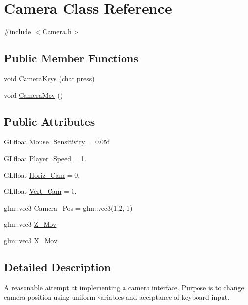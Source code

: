 \hypertarget{class_camera}{}\section{Camera Class Reference}
\label{class_camera}


{\ttfamily \#include $<$Camera.\+h$>$}

\subsection*{Public Member Functions}
\begin{DoxyCompactItemize}
\item 
void \hyperlink{class_camera_ae97e22115cee81d2901119faa9d23f38}{Camera\+Keys} (char press)
\item 
void \hyperlink{class_camera_a9d65e0f62f7e8b3f73206c78c23a3734}{Camera\+Mov} ()
\end{DoxyCompactItemize}
\subsection*{Public Attributes}
\begin{DoxyCompactItemize}
\item 
G\+Lfloat \hyperlink{class_camera_ada530cf7b97b15431c729ddc3435d702}{Mouse\+\_\+\+Sensitivity} = 0.\+05f
\item 
G\+Lfloat \hyperlink{class_camera_ab20174a89f86b685216dfe825e9ce95d}{Player\+\_\+\+Speed} = 1.
\item 
G\+Lfloat \hyperlink{class_camera_a7b52b1b9a336c038442c6442d1fcbf92}{Horiz\+\_\+\+Cam} = 0.
\item 
G\+Lfloat \hyperlink{class_camera_a04b5fdf888820779329b982e3f7cc635}{Vert\+\_\+\+Cam} = 0.
\item 
glm\+::vec3 \hyperlink{class_camera_abc7eb4129b1e04323354ab456b441348}{Camera\+\_\+\+Pos} = glm\+::vec3(1,2,-\/1)
\item 
glm\+::vec3 \hyperlink{class_camera_ae0e1410bf317b08212f1ce3b0b8fc18a}{Z\+\_\+\+Mov}
\item 
glm\+::vec3 \hyperlink{class_camera_ab968e0816b2909fddcd19886e0fae3f0}{X\+\_\+\+Mov}
\end{DoxyCompactItemize}


\subsection{Detailed Description}
A reasonable attempt at implementing a camera interface. Purpose is to change camera position using uniform variables and acceptance of keyboard input. 


